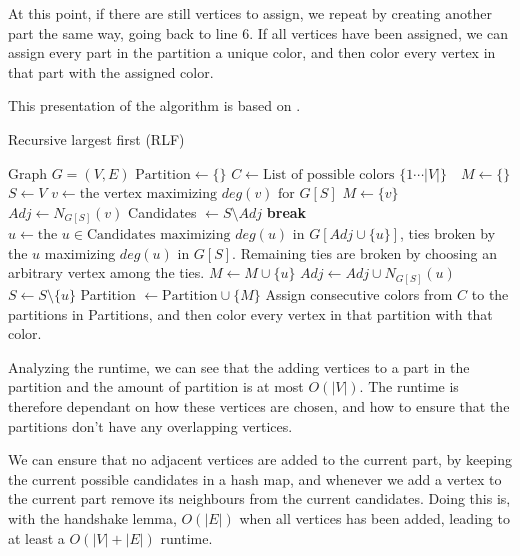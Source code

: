 \documentclass[a4paper]{article}
\newcommand{\algorithmicbreak}{\textbf{break}}
\newcommand{\BREAK}{\STATE \algorithmicbreak}
\begin{document}
At this point, if there are still vertices to assign, we repeat by creating
another part the same way, going back to line 6. If all vertices have been assigned, we can assign every part in
the partition a unique color, and then color every vertex in that part with the
assigned color.

This presentation of the algorithm is based on \cite{Constructive}.
\begin{algorithm}[H]
  \caption{Recursive largest first (RLF)}
  \label{alg:rlf}
  \begin{algorithmic}[1]
      \REQUIRE Graph $G = (V,E)$
      \STATE $\text{Partition} \leftarrow \{\}$
      \STATE $C \leftarrow \text{List of possible colors $\{1 \cdots |V| \}$ }$
      \STATE $M \leftarrow \{\}$
      \STATE $S \leftarrow V$
        \STATE $v \leftarrow \text{the vertex maximizing $deg(v)$ for $G[S]$} $
        \STATE $M \leftarrow \{v\}$
        \STATE $Adj \leftarrow N_{G[S]}(v)$
            \STATE Candidates $\leftarrow S \setminus Adj$
                \BREAK
            \ENDIF
            \STATE $u \leftarrow \text{the $u \in \text{Candidates}$ maximizing $deg(u)$ in $G[Adj \cup \{u\}]$}$, ties broken by 
            the $u$ maximizing $deg(u)$ in $G[S]$. Remaining ties are broken by
            choosing an arbitrary vertex among the ties.
            \STATE $M \leftarrow M \cup \{u\}$
            \STATE $Adj \leftarrow Adj \cup N_{G[S]}(u)$
            \STATE $S \leftarrow S \setminus \{u\}$
        \ENDWHILE
        \STATE Partition $\leftarrow \text{Partition} \cup \{M\}$ 
      \ENDWHILE
      \STATE Assign consecutive colors from $C$ to the partitions in Partitions,
      and then color every vertex in that partition with that color.
  \end{algorithmic}
\end{algorithm}

Analyzing the runtime, we can see that the adding vertices to a
part in the partition and the amount of partition is at most $O(|V|)$. The
runtime is therefore dependant on how these vertices are chosen, and how to
ensure that the partitions don't have any overlapping vertices. 

We can ensure
that no adjacent vertices are added to the current part, by keeping the current
possible candidates in a hash map, and whenever we add a vertex to the current
part remove its neighbours from the current candidates. Doing this is, with the
handshake lemma, $O(|E|)$ when all vertices has been added, leading to at least
a $O(|V|+|E|)$ runtime.  
\end{document}
